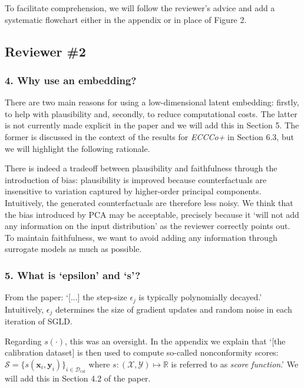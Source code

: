\documentclass[letterpaper]{article} %
\begin{document}
To facilitate comprehension, we will follow the reviewer's advice and add a systematic flowchart either in the appendix or in place of Figure 2.

\subsection*{Reviewer \#2}

\subsubsection{4. Why use an embedding?}

There are two main reasons for using a low-dimensional latent embedding: firstly, to help with plausibility and, secondly, to reduce computational costs. The latter is not currently made explicit in the paper and we will add this in Section 5. The former is discussed in the context of the results for \textit{ECCCo+} in Section 6.3, but we will highlight the following rationale. 

There is indeed a tradeoff between plausibility and faithfulness through the introduction of bias: plausibility is improved because counterfactuals are insensitive to variation captured by higher-order principal components. Intuitively, the generated counterfactuals are therefore less noisy. We think that the bias introduced by PCA may be acceptable, precisely because it `will not add any information on the input distribution' as the reviewer correctly points out. To maintain faithfulness, we want to avoid adding any information through surrogate models as much as possible.

\subsubsection{5. What is `epsilon' and `s'?}

From the paper: `[...] the step-size $\epsilon_j$ is typically polynomially decayed.' Intuitively, $\epsilon_j$ determines the size of gradient updates and random noise in each iteration of SGLD.

Regarding $s(\cdot)$, this was an oversight. In the appendix we explain that `[the calibration dataset] is then used to compute so-called nonconformity scores: $\mathcal{S}=\{s(\mathbf{x}_i,\mathbf{y}_i)\}_{i \in \mathcal{D}_{\text{cal}}}$ where $s: (\mathcal{X},\mathcal{Y}) \mapsto \mathbb{R}$ is referred to as \textit{score function}.' We will add this in Section 4.2 of the paper. 
\end{document}
